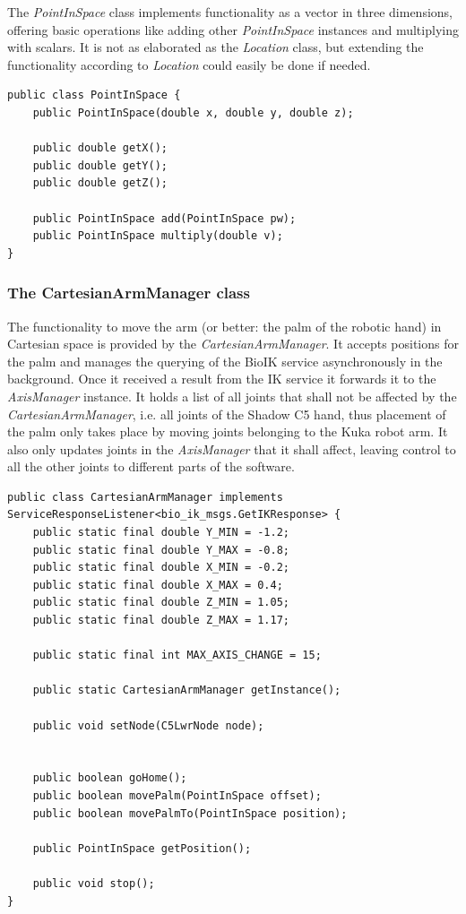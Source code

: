 The \textit{PointInSpace} class implements functionality as a vector in three dimensions, offering basic operations like adding other \textit{PointInSpace} instances and multiplying with scalars. It is not as elaborated as the \textit{Location} class, but extending the functionality according to \textit{Location} could easily be done if needed.

\begin{lstlisting}[caption={The public interface of PointInSpace}]
public class PointInSpace {
	public PointInSpace(double x, double y, double z);
	
	public double getX();
	public double getY();
	public double getZ();
	
	public PointInSpace add(PointInSpace pw);
	public PointInSpace multiply(double v);
}

\end{lstlisting}

\subsubsection{The CartesianArmManager class}

The functionality to move the arm (or better: the palm of the robotic hand) in Cartesian space is provided by the \textit{CartesianArmManager}. It accepts positions for the palm and manages the querying of the BioIK service asynchronously in the background. Once it received a result from the IK service it forwards it to the \textit{AxisManager} instance. It holds a list of all joints that shall not be affected by the \textit{CartesianArmManager}, i.e. all joints of the Shadow C5 hand, thus placement of the palm only takes place by moving joints belonging to the Kuka robot arm. It also only updates joints in the \textit{AxisManager} that it shall affect, leaving control to all the other joints to different parts of the software.

\begin{lstlisting}[caption={The public interface of CartesianArmManager}, label=lst:impl:cartarm]
public class CartesianArmManager implements ServiceResponseListener<bio_ik_msgs.GetIKResponse> {
	public static final double Y_MIN = -1.2;
	public static final double Y_MAX = -0.8;
	public static final double X_MIN = -0.2;
	public static final double X_MAX = 0.4;
	public static final double Z_MIN = 1.05;
	public static final double Z_MAX = 1.17;
	
	public static final int MAX_AXIS_CHANGE = 15;
	
	public static CartesianArmManager getInstance();
	
	public void setNode(C5LwrNode node);
	
	
	public boolean goHome();
	public boolean movePalm(PointInSpace offset);
	public boolean movePalmTo(PointInSpace position);
	
	public PointInSpace getPosition();
	
	public void stop();
}
\end{lstlisting}

